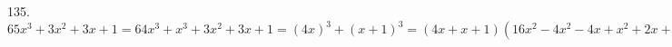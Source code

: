 135. $65x^3+3x^2+3x+1=64x^3+x^3+3x^2+3x+1=(4x)^3+(x+1)^3=(4x+x+1)(16x^2-4x^2-4x+x^2+2x+1)=(5x+1)(13x^2-2x+1).$\\

